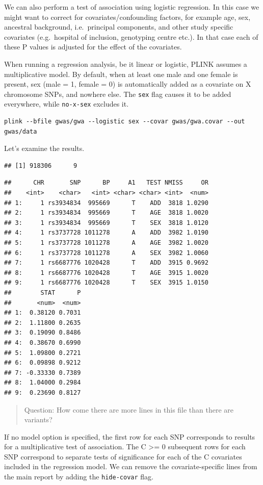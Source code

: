 \documentclass[
]{book}
\newcommand{\passthrough}[1]{#1}
\begin{document}
We can also perform a test of association using logistic regression. In this case we might want to correct for covariates/confounding factors, for example age, sex, ancestral background, i.e.~principal components, and other study specific covariates (e.g.~hospital of inclusion, genotyping centre etc.). In that case each of these P values is adjusted for the effect of the covariates.

When running a regression analysis, be it linear or logistic, PLINK assumes a multiplicative model. By default, when at least one male and one female is present, sex (male = 1, female = 0) is automatically added as a covariate on X chromosome SNPs, and nowhere else. The \passthrough{\lstinline!sex!} flag causes it to be added everywhere, while \passthrough{\lstinline!no-x-sex!} excludes it.

\begin{lstlisting}
plink --bfile gwas/gwa --logistic sex --covar gwas/gwa.covar --out gwas/data
\end{lstlisting}

Let's examine the results.

\begin{lstlisting}
## [1] 918306      9
\end{lstlisting}

\begin{lstlisting}
##      CHR       SNP      BP     A1   TEST NMISS     OR
##    <int>    <char>   <int> <char> <char> <int>  <num>
## 1:     1 rs3934834  995669      T    ADD  3818 1.0290
## 2:     1 rs3934834  995669      T    AGE  3818 1.0020
## 3:     1 rs3934834  995669      T    SEX  3818 1.0120
## 4:     1 rs3737728 1011278      A    ADD  3982 1.0190
## 5:     1 rs3737728 1011278      A    AGE  3982 1.0020
## 6:     1 rs3737728 1011278      A    SEX  3982 1.0060
## 7:     1 rs6687776 1020428      T    ADD  3915 0.9692
## 8:     1 rs6687776 1020428      T    AGE  3915 1.0020
## 9:     1 rs6687776 1020428      T    SEX  3915 1.0150
##        STAT      P
##       <num>  <num>
## 1:  0.38120 0.7031
## 2:  1.11800 0.2635
## 3:  0.19090 0.8486
## 4:  0.38670 0.6990
## 5:  1.09800 0.2721
## 6:  0.09898 0.9212
## 7: -0.33330 0.7389
## 8:  1.04000 0.2984
## 9:  0.23690 0.8127
\end{lstlisting}

\begin{quote}
Question: How come there are more lines in this file than there are variants?
\end{quote}

If no model option is specified, the first row for each SNP corresponds to results for a multiplicative test of association. The C \textgreater= 0 subsequent rows for each SNP correspond to separate tests of significance for each of the C covariates included in the regression model. We can remove the covariate-specific lines from the main report by adding the \passthrough{\lstinline!hide-covar!} flag.
\end{document}
